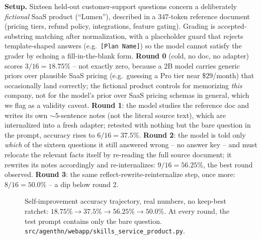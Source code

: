 \documentclass[11pt]{article}
\newcommand{\mt}[1]{\texttt{\small #1}}
\begin{document}
\textbf{Setup.} Sixteen held-out customer-support questions concern a deliberately \emph{fictional} SaaS product (``Lumen''), described in a $347$-token reference document (pricing tiers, refund policy, integrations, feature gating). Grading is accepted-substring matching after normalization, with a placeholder guard that rejects template-shaped answers (e.g.\ \mt{[Plan Name]}) so the model cannot satisfy the grader by echoing a fill-in-the-blank form. \textbf{Round 0} (cold, no doc, no adapter) scores $3/16=18.75\%$ -- not exactly zero, because a $2$B model carries generic priors over plausible SaaS pricing (e.g.\ guessing a Pro tier near \$$29$/month) that occasionally land correctly; the fictional product controls for memorizing \emph{this} company, not for the model's prior over SaaS pricing schemas in general, which we flag as a validity caveat. \textbf{Round 1}: the model studies the reference doc and writes its own $\sim\!5$-sentence notes (not the literal source text), which are internalized into a fresh adapter; retested with nothing but the bare question in the prompt, accuracy rises to $6/16=37.5\%$. \textbf{Round 2}: the model is told only \emph{which} of the sixteen questions it still answered wrong -- no answer key -- and must relocate the relevant facts itself by re-reading the full source document; it rewrites its notes accordingly and re-internalizes: $9/16=56.25\%$, the best round observed. \textbf{Round 3}: the same reflect-rewrite-reinternalize step, once more: $8/16=50.0\%$ -- a dip below round 2.

\begin{figure}[t]
\centering
{}
\caption{Self-improvement accuracy trajectory, real numbers, no keep-best ratchet: $18.75\% \to 37.5\% \to 56.25\% \to 50.0\%$. At every round, the test prompt contains only the bare question. \mt{src/agenthn/webapp/skills\_service\_product.py}.}
\label{fig:selfimprove}
\end{figure}
\end{document}
